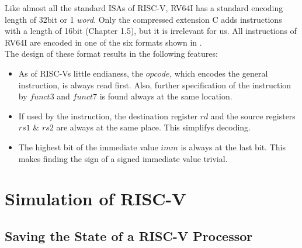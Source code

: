 Like almost all the standard ISAs of RISC-V, RV64I has a standard encoding length of 32bit or 1 \emph{word}.
Only the compressed extension C adds instructions with a length of 16bit \cite{riscv-isa}(Chapter 1.5), but it is irrelevant for us.
All instructions of RV64I are encoded in one of the six formats shown in .\\
The design of these format results in the following features:
\begin{itemize}
    \item As of RISC-Vs little endianess, the $opcode$, which encodes the general instruction, is always read first.
          Also, further specification of the instruction by $funct3$ and $funct7$ is found always at the same location.
    \item If used by the instruction, the destination register $rd$ and the source registers $rs1$ \& $rs2$ are always at the same place. This simplifys decoding.
    \item The highest bit of the immediate value $imm$ is always at the last bit. This makes finding the sign of a signed immediate value trivial.
\end{itemize}






\section{Simulation of RISC-V}

\subsection{Saving the State of a RISC-V Processor}\label{statefile}